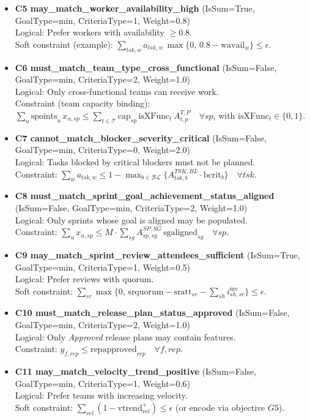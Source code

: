 \documentclass[a4paper,11pt]{article}
\begin{document}
\begin{itemize}[leftmargin=2.2em]
  \item \textbf{C5 may\_match\_worker\_availability\_high} (IsSum=True, GoalType=min, CriteriaType=1, Weight=0.8)\\
  Logical: Prefer workers with availability $\ge 0.8$.\\
  Soft constraint (example): $\displaystyle \sum_{tsk,w} a_{tsk,w}\,\max\{0,\,0.8-\text{wavail}_w\}\le \epsilon$.
  \item \textbf{C6 must\_match\_team\_type\_cross\_functional} (IsSum=False, GoalType=min, CriteriaType=2, Weight=1.0)\\
  Logical: Only cross-functional teams can receive work.\\
  Constraint (team capacity binding): $\displaystyle \sum_{u} \text{spoints}_u\, x_{u,sp} \le \sum_{t\in\mathcal{T}} \text{cap}_{sp}\,\text{isXFunc}_t\, A^{T,P}_{t,p}\quad \forall sp$, with $\text{isXFunc}_t\in\{0,1\}$.
  \item \textbf{C7 cannot\_match\_blocker\_severity\_critical} (IsSum=False, GoalType=min, CriteriaType=0, Weight=2.0)\\
  Logical: Tasks blocked by critical blockers must not be planned.\\
  Constraint: $\displaystyle \sum_{w} a_{tsk,w} \le 1-\max_{b\in\mathcal{BL}}\{A^{TSK,BL}_{tsk,b}\cdot \text{bcrit}_b\}\quad \forall tsk$.
  \item \textbf{C8 must\_match\_sprint\_goal\_achievement\_status\_aligned} (IsSum=False, GoalType=min, CriteriaType=2, Weight=1.0)\\
  Logical: Only sprints whose goal is aligned may be populated.\\
  Constraint: $\displaystyle \sum_{u} x_{u,sp} \le M\cdot \sum_{sg} A^{SP,SG}_{sp,sg}\,\text{sgaligned}_{sg}\quad \forall sp$.
  \item \textbf{C9 may\_match\_sprint\_review\_attendees\_sufficient} (IsSum=True, GoalType=min, CriteriaType=1, Weight=0.5)\\
  Logical: Prefer reviews with quorum.\\
  Soft constraint: $\displaystyle \sum_{sr}\max\{0,\,\text{srquorum}-\text{sratt}_{sr}-\sum_{sh} i^{\text{inv}}_{sh,sr}\}\le \epsilon$.
  \item \textbf{C10 must\_match\_release\_plan\_status\_approved} (IsSum=False, GoalType=min, CriteriaType=2, Weight=1.0)\\
  Logical: Only \emph{Approved} release plans may contain features.\\
  Constraint: $\displaystyle y_{f,rep}\le \text{repapproved}_{rep}\quad \forall f,rep$.
  \item \textbf{C11 may\_match\_velocity\_trend\_positive} (IsSum=False, GoalType=min, CriteriaType=1, Weight=0.6)\\
  Logical: Prefer teams with increasing velocity.\\
  Soft constraint: $\displaystyle \sum_{vel} (1-\text{vtrend}^{+}_{vel}) \le \epsilon$ (or encode via objective $G5$).
\end{itemize}
\end{document}
